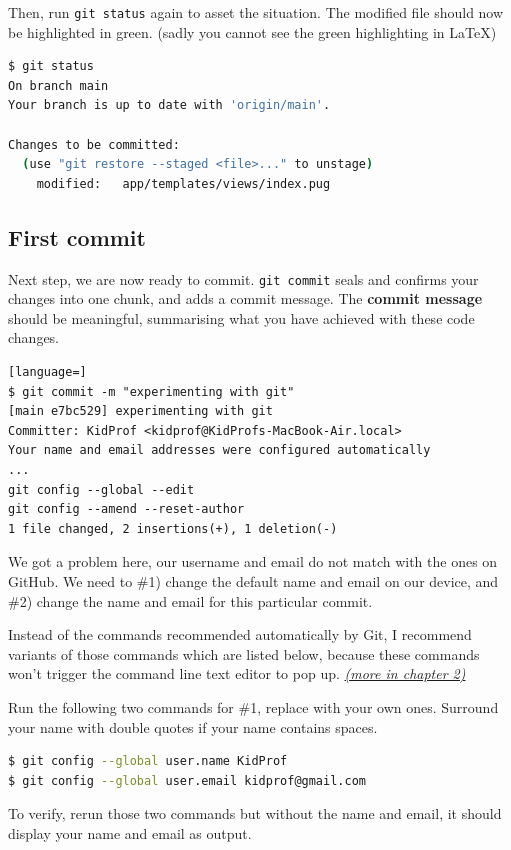 Then, run \texttt{git status} again to asset the situation. The modified file should now be highlighted in green. (sadly you cannot see the green highlighting in LaTeX)

\begin{lstlisting}[language=bash]
$ git status
On branch main
Your branch is up to date with 'origin/main'.

Changes to be committed:
  (use "git restore --staged <file>..." to unstage)
	modified:   app/templates/views/index.pug
\end{lstlisting}

\subsection*{First commit}

Next step, we are now ready to commit. \texttt{git commit} seals and confirms your changes into one chunk, and adds a commit message. The \textbf{commit message} should be meaningful, summarising what you have achieved with these code changes.

\begin{lstlisting}[language=]
$ git commit -m "experimenting with git"
[main e7bc529] experimenting with git
Committer: KidProf <kidprof@KidProfs-MacBook-Air.local>
Your name and email addresses were configured automatically
...
git config --global --edit
git config --amend --reset-author
1 file changed, 2 insertions(+), 1 deletion(-)
\end{lstlisting}

We got a problem here, our username and email do not match with the ones on GitHub. We need to \#1) change the default name and email on our device, and \#2) change the name and email for this particular commit.

Instead of the commands recommended automatically by Git, I recommend variants of those commands which are listed below, because these commands won't trigger the command line text editor to pop up. \textit{\hyperref[sec:vim]{(more in chapter 2)}}

Run the following two commands for \#1, replace with your own ones. Surround your name with double quotes if your name contains spaces.

\begin{lstlisting}[language=bash]
$ git config --global user.name KidProf
$ git config --global user.email kidprof@gmail.com
\end{lstlisting}

To verify, rerun those two commands but without the name and email, it should display your name and email as output.

